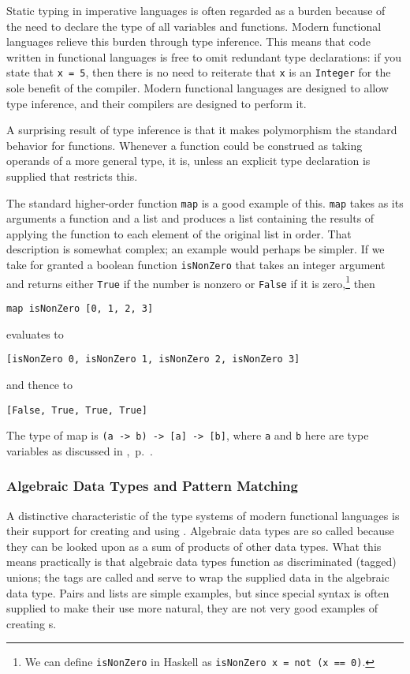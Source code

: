 Static typing in imperative languages is often regarded as a burden because of the need to declare the type of all variables and functions. Modern functional languages relieve this burden through type inference. This means that code written in functional languages is free to omit redundant type declarations: if you state that \lstinline{x = 5}, then there is no need to reiterate that \lstinline{x} is an \lstinline{Integer} for the sole benefit of the compiler. Modern functional languages are designed to allow type inference, and their compilers are designed to perform it.

A surprising result of type inference is that it makes polymorphism the standard behavior for functions. Whenever a function could be construed as taking operands of a more general type, it is, unless an explicit type declaration is supplied that restricts this.

The standard higher-order function \lstinline{map} is a good example of this. \lstinline{map} takes as its arguments a function and a list and produces a list containing the results of applying the function to each element of the original list in order. That description is somewhat complex; an example would perhaps be simpler. If we take for granted a boolean function \lstinline{isNonZero} that takes an integer argument and returns either \lstinline{True} if the number is nonzero or \lstinline{False} if it is zero,\footnote{We can define \lstinline{isNonZero} in Haskell as \lstinline{isNonZero x = not (x == 0)}.} then 
\begin{lstlisting}
map isNonZero [0, 1, 2, 3]
\end{lstlisting}
evaluates to 
\begin{lstlisting}
[isNonZero 0, isNonZero 1, isNonZero 2, isNonZero 3]
\end{lstlisting}
and thence to 
\begin{lstlisting}
[False, True, True, True]
\end{lstlisting}
The type of map is \lstinline{(a -> b) -> [a] -> [b]}, where \lstinline{a} and \lstinline{b} here are type variables as discussed in ,~p.~\pageref{types:polymorphism}.

\subsubsection{Algebraic Data Types and Pattern Matching}
A distinctive characteristic of the type systems of modern functional languages is their support for creating and using . Algebraic data types are so called because they can be looked upon as a sum of products of other data types. What this means practically is that algebraic data types function as discriminated (tagged) unions; the tags are called  and serve to wrap the supplied data in the algebraic data type. Pairs and lists are simple examples, but since special syntax is often supplied to make their use more natural, they are not very good examples of creating s.

